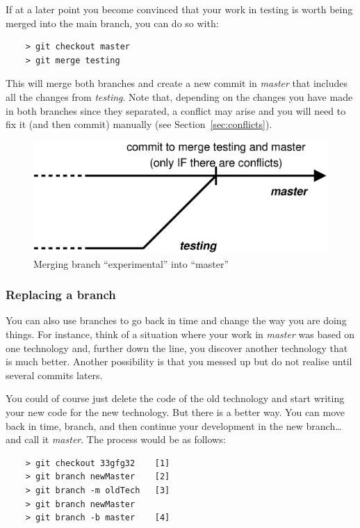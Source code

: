 If at a later point you become convinced that your work
in testing is worth being merged into the main branch, you can do so
with:

\begin{verbatim}
    > git checkout master
    > git merge testing
\end{verbatim}

This will merge both branches and create a new commit in \emph{master}
that includes all the changes from \emph{testing}. Note that,
depending on the changes you have made in both branches since they
separated, a conflict may arise and you will need to 
fix it (and then commit) manually (see Section~\ref{sec:conflicts}).

\begin{figure}[htbp!]
  \centering
  \includegraphics[width=\textwidth]{gfx/commit_history_4.eps}
  \caption{Merging branch ``experimental'' into ``master''}
  \label{fig:git-example-4}
\end{figure}

\subsubsection*{Replacing a branch}
\label{sec:exercise-1ff}

You can also use branches to go back in time and change the way you
are doing things. For instance, think of a situation where your work
in \emph{master} was based on one technology and, further down the
line, you discover another technology that is much better. Another
possibility is that you messed up but do not realise until several
commits laters. 

You could of course just delete the code of the old technology and
start writing your new code for the new technology. But there is a
better way. You can move back in time, branch, and then continue your
development in the new branch\ldots and call it \emph{master}. The
process would be as follows: 

\begin{verbatim}
    > git checkout 33gfg32    [1]
    > git branch newMaster    [2]
    > git branch -m oldTech   [3]
    > git branch newMaster    
    > git branch -b master    [4]
\end{verbatim}


